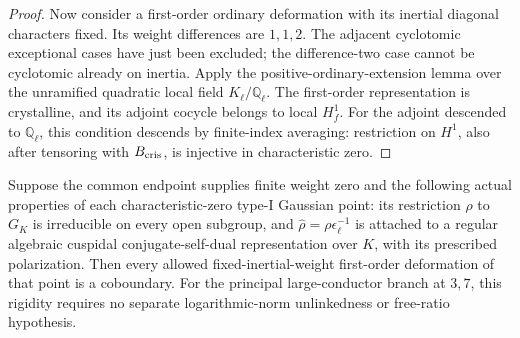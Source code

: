 \begin{proof}
Now consider a first-order ordinary deformation with its
inertial diagonal characters fixed.
Its weight differences are \(1,1,2\).
The adjacent cyclotomic exceptional cases have just been
excluded; the difference-two case cannot be cyclotomic
already on inertia.
Apply the positive-ordinary-extension lemma over the
unramified quadratic local field \(K_\ell/\mathbb Q_\ell\).
The first-order representation is crystalline, and its
adjoint cocycle belongs to local \(H^1_f\).
For the adjoint descended to \(\mathbb Q_\ell\), this
condition descends by finite-index averaging:
restriction on \(H^1\), also after tensoring with
\(B_{\rm cris}\), is injective in characteristic zero.
\end{proof}

\begin{srproposition}
\label{prop:sr-gaussian-rigidity}
Suppose the common endpoint supplies finite weight zero
and the following actual properties of each characteristic-zero
type-I Gaussian point: its restriction \(\rho\) to \(G_K\)
is irreducible on every open subgroup, and
\(\widehat\rho=\rho\epsilon_\ell^{-1}\) is attached to a
regular algebraic cuspidal conjugate-self-dual representation
over \(K\), with its prescribed polarization.
Then every allowed fixed-inertial-weight first-order
deformation of that point is a coboundary.
For the principal large-conductor branch at \(3,7\), this
rigidity requires no separate logarithmic-norm unlinkedness
or free-ratio hypothesis.
\end{srproposition}
